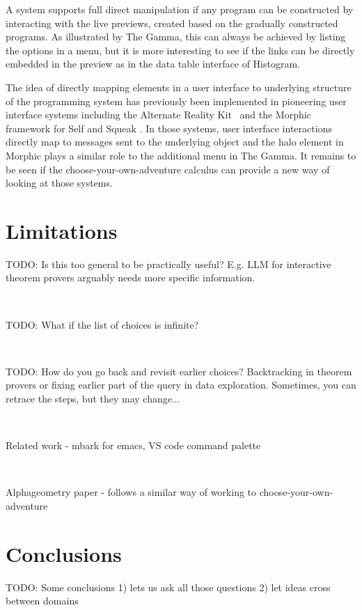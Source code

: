 \documentclass[a4paper,UKenglish,cleveref, autoref, thm-restate]{lipics-v2021}
\begin{document}
A system supports full direct manipulation if any program can be constructed by interacting with
the live previews, created based on the gradually constructed programs. As illustrated by The Gamma,
this can always be achieved by listing the options in a menu, but it is more interesting to see
if the links can be directly embedded in the preview as in the data table interface of Histogram.

The idea of directly mapping elements in a user interface to underlying structure of the
programming system has previously been implemented in pioneering user interface systems
including the Alternate Reality Kit~\cite{randall-1986-ark} and the Morphic framework for
Self and Squeak \cite{maloney-1995-morphic,maloney-2001-morphic}. In those systems, user interface
interactions directly map to messages sent to the underlying object and the halo element in
Morphic plays a similar role to the additional menu in The Gamma. It remains to be seen if
the choose-your-own-adventure calculus can provide a new way of looking at those systems.

\section{Limitations}

TODO: Is this too general to be practically useful? E.g. LLM for interactive theorem provers
arguably needs more specific information.

~

\noindent
TODO: What if the list of choices is infinite?

~

\noindent
TODO: How do you go back and revisit earlier choices? Backtracking in theorem provers or
fixing earlier part of the query in data exploration. Sometimes, you can retrace the
steps, but they may change...

~

\noindent
Related work - mbark for emacs, VS code command palette

~

\noindent
Alphageometry paper - follows a similar way of working to choose-your-own-adventure

\section{Conclusions}

TODO: Some conclusions
1) lets us ask all those questions
2) let ideas cross between domains

\newpage



\end{document}
